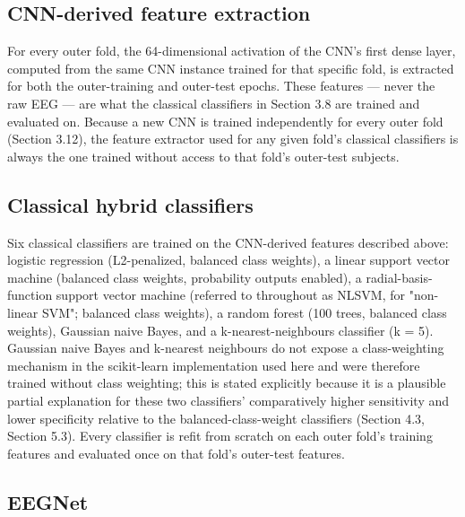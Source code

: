 \documentclass[a4paper,fleqn]{cas-sc}
\begin{document}
\subsection{CNN-derived feature extraction}

For every outer fold, the 64-dimensional activation of the CNN's first dense layer, computed from the same CNN instance trained for that specific fold, is extracted for both the outer-training and outer-test epochs. These features --- never the raw EEG --- are what the classical classifiers in Section 3.8 are trained and evaluated on. Because a new CNN is trained independently for every outer fold (Section 3.12), the feature extractor used for any given fold's classical classifiers is always the one trained without access to that fold's outer-test subjects.



\subsection{Classical hybrid classifiers}

Six classical classifiers are trained on the CNN-derived features described above: logistic regression (L2-penalized, balanced class weights), a linear support vector machine (balanced class weights, probability outputs enabled), a radial-basis-function support vector machine (referred to throughout as NLSVM, for "non-linear SVM"; balanced class weights), a random forest (100 trees, balanced class weights), Gaussian naive Bayes, and a k-nearest-neighbours classifier (k = 5). Gaussian naive Bayes and k-nearest neighbours do not expose a class-weighting mechanism in the scikit-learn implementation used here and were therefore trained without class weighting; this is stated explicitly because it is a plausible partial explanation for these two classifiers' comparatively higher sensitivity and lower specificity relative to the balanced-class-weight classifiers (Section 4.3, Section 5.3). Every classifier is refit from scratch on each outer fold's training features and evaluated once on that fold's outer-test features.



\subsection{EEGNet}
\end{document}
